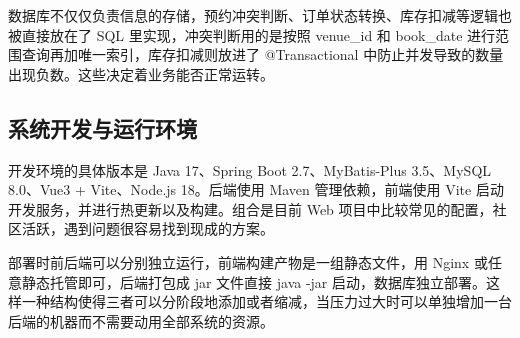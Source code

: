 数据库不仅仅负责信息的存储，预约冲突判断、订单状态转换、库存扣减等逻辑也被直接放在了 SQL 里实现，冲突判断用的是按照 venue\_id 和 book\_date 进行范围查询再加唯一索引，库存扣减则放进了 @Transactional 中防止并发导致的数量出现负数。这些决定着业务能否正常运转。

\subsection{系统开发与运行环境}

开发环境的具体版本是 Java 17、Spring Boot 2.7、MyBatis-Plus 3.5、MySQL 8.0、Vue3 + Vite、Node.js 18。后端使用 Maven 管理依赖，前端使用 Vite 启动开发服务，并进行热更新以及构建。组合是目前 Web 项目中比较常见的配置，社区活跃，遇到问题很容易找到现成的方案。

部署时前后端可以分别独立运行，前端构建产物是一组静态文件，用 Nginx 或任意静态托管即可，后端打包成 jar 文件直接 java -jar 启动，数据库独立部署。这样一种结构使得三者可以分阶段地添加或者缩减，当压力过大时可以单独增加一台后端的机器而不需要动用全部系统的资源。

